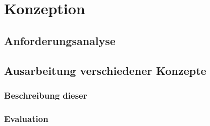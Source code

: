 \chapter{Konzeption}
\label{ch:Design}

\section{Anforderungsanalyse}

\section{Ausarbeitung verschiedener Konzepte}
	\subsection{Beschreibung dieser}
	\subsection{Evaluation}
	



